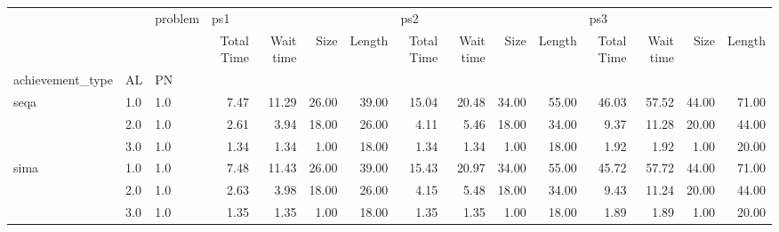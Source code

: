 \begin{tabular}{lllrrrrrrrrrrrr}
\toprule
     &     & problem & \multicolumn{4}{l}{ps1} & \multicolumn{4}{l}{ps2} & \multicolumn{4}{l}{ps3} \\
     &     & {} & Total Time & Wait time &  Size & Length & Total Time & Wait time &  Size & Length & Total Time & Wait time &  Size & Length \\
achievement\_type & AL & PN &            &           &       &        &            &           &       &        &            &           &       &        \\
\midrule
seqa & 1.0 & 1.0 &       7.47 &     11.29 & 26.00 &  39.00 &      15.04 &     20.48 & 34.00 &  55.00 &      46.03 &     57.52 & 44.00 &  71.00 \\
     & 2.0 & 1.0 &       2.61 &      3.94 & 18.00 &  26.00 &       4.11 &      5.46 & 18.00 &  34.00 &       9.37 &     11.28 & 20.00 &  44.00 \\
     & 3.0 & 1.0 &       1.34 &      1.34 &  1.00 &  18.00 &       1.34 &      1.34 &  1.00 &  18.00 &       1.92 &      1.92 &  1.00 &  20.00 \\
sima & 1.0 & 1.0 &       7.48 &     11.43 & 26.00 &  39.00 &      15.43 &     20.97 & 34.00 &  55.00 &      45.72 &     57.72 & 44.00 &  71.00 \\
     & 2.0 & 1.0 &       2.63 &      3.98 & 18.00 &  26.00 &       4.15 &      5.48 & 18.00 &  34.00 &       9.43 &     11.24 & 20.00 &  44.00 \\
     & 3.0 & 1.0 &       1.35 &      1.35 &  1.00 &  18.00 &       1.35 &      1.35 &  1.00 &  18.00 &       1.89 &      1.89 &  1.00 &  20.00 \\
\bottomrule
\end{tabular}
